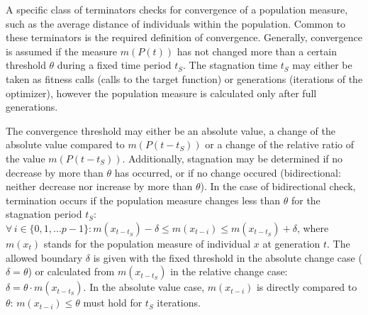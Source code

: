 A specific class of terminators checks for convergence of a population
measure, such as the average distance of individuals within the population.
Common to these terminators is the required definition of convergence.
Generally, convergence is assumed if the measure $m(P(t))$ has not
changed more than a certain threshold $\theta$ during a fixed time
period $t_{S}$. The stagnation time $t_{S}$ may either be taken
as fitness calls (calls to the target function) or generations (iterations
of the optimizer), however the population measure is calculated only
after full generations.

The convergence threshold may either be an absolute value, a change
of the absolute value compared to $m(P(t-t_{S}))$ or a change of
the relative ratio of the value $m(P(t-t_{S}))$. Additionally, stagnation
may be determined if no decrease by more than \texttt{$\theta$} has
occurred, or if no change occured (bidirectional: neither decrease
nor increase by more than \texttt{$\theta$}). In the case of bidirectional
check, termination occurs if the population measure changes less than
\emph{$\theta$} for the stagnation period \emph{$t_{S}$}: $\forall\, i\in\{0,1,...p-1\}:m(x_{t-t_{S}})-\delta\le m(x_{t-i})\le m(x_{t-t_{S}})+\delta$,
where $m(x_{t})$ stands for the population measure of individual
$x$ at generation $t$. The allowed boundary $\delta$ is given with
the fixed threshold in the absolute change case ($\delta=\theta$)
or calculated from $m(x_{t-t_{S}})$ in the relative change case:
$\delta=\theta\cdot m(x_{t-t_{S}})$. In the absolute value case,
$m(x_{t-i})$ is directly compared to $\theta$: $m(x_{t-i})\leq\theta$
must hold for $t_{S}$ iterations.

